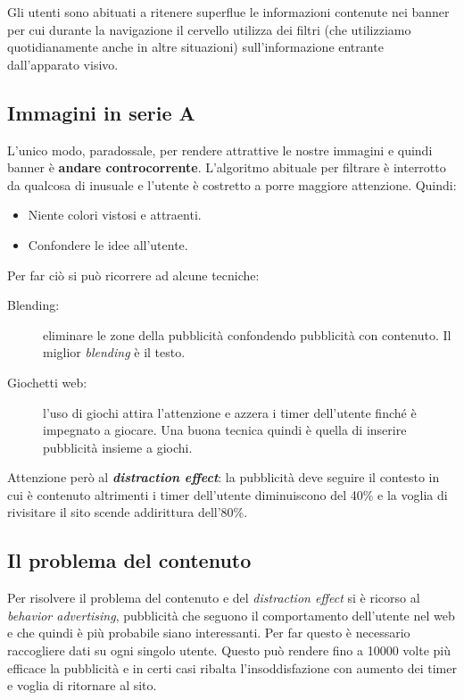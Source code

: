 				Gli utenti sono abituati a ritenere superflue le informazioni contenute nei banner per cui durante la navigazione il cervello utilizza dei filtri (che utilizziamo quotidianamente anche in altre situazioni) sull'informazione entrante dall'apparato visivo.		
			
		\subsection{Immagini in serie A}
			L'unico modo, paradossale, per rendere attrattive le nostre immagini e quindi banner è \textbf{andare controcorrente}. L'algoritmo abituale per filtrare è interrotto da qualcosa di inusuale e l'utente è costretto a porre maggiore attenzione. Quindi:
			\begin{itemize}
				\item Niente colori vistosi e attraenti.
				\item Confondere le idee all'utente.
			\end{itemize}
			Per far ciò si può ricorrere ad alcune tecniche:
			\begin{description}
				\item[Blending:] eliminare le zone della pubblicità confondendo pubblicità con contenuto. Il miglior \emph{blending} è il testo.
				\item[Giochetti web:] l'uso di giochi attira l'attenzione e azzera i timer dell'utente finché è impegnato a giocare. Una buona tecnica quindi è quella di inserire pubblicità insieme a giochi.
			\end{description}
			
			Attenzione però al \textbf{\emph{distraction effect}}: la pubblicità deve seguire il contesto in cui è contenuto altrimenti i timer dell'utente diminuiscono del 40\% e la voglia di rivisitare il sito scende addirittura dell'80\%.
		
		\subsection{Il problema del contenuto}
			Per risolvere il problema del contenuto e del \emph{distraction effect} si è ricorso al \emph{behavior advertising}, pubblicità che seguono il comportamento dell'utente nel web e che quindi è più probabile siano interessanti. Per far questo è necessario raccogliere dati su ogni singolo utente. Questo può rendere fino a 10000 volte più efficace la pubblicità e in certi casi ribalta l'insoddisfazione con aumento dei timer e voglia di ritornare al sito.
